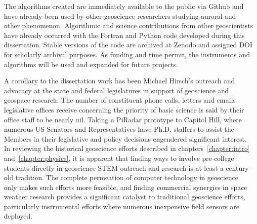The algorithms created are immediately available to the public via Github and have already been used by other geoscience researchers studying auroral and other phenomenon. 
Algorithmic and science contributions from other geoscientists have already occurred with the Fortran and Python code developed during this dissertation.
Stable versions of the code are archived at Zenodo and assigned DOI for scholarly archival purposes.
As funding and time permit, the instruments and algorithms will be used and expanded for future projects.

A corollary to the dissertation work has been Michael Hirsch's outreach and advocacy at the state and federal legislatures in support of geoscience and geospace research.
The number of constituent phone calls, letters and emails legislative offices receive concerning the priority of basic science is said by their office staff to be nearly nil.
Taking a PiRadar prototype to Capitol Hill, where numerous US Senators and Representatives have Ph.D. staffers to assist the Members in their legislative and policy decisions engendered significant interest.
In reviewing the historical geoscience efforts described in chapters~\ref{chapter:intro} and~\ref{chapter:physics}, it is apparent that finding ways to involve pre-college students directly in geoscience STEM outreach and research is at least a century-old tradition.
The complete permeation of computer technology in geoscience only makes such efforts more feasible, and finding commercial synergies in space weather research provides a significant catalyst to traditional geoscience efforts, particularly instrumental efforts where numerous inexpensive field sensors are deployed.

